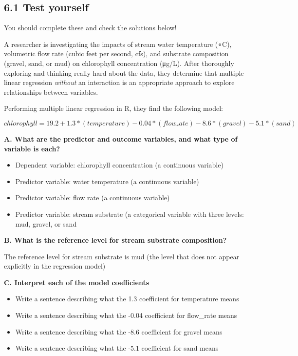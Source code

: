 \documentclass[
]{article}
\begin{document}
\hypertarget{test-yourself}{%
\subsection{6.1 Test yourself}\label{test-yourself}}

You should complete these and check the solutions below!

A researcher is investigating the impacts of stream water temperature
(∘C), volumetric flow rate (cubic feet per second, cfs), and substrate
composition (gravel, sand, or mud) on chlorophyll concentration (μg/L).
After thoroughly exploring and thinking really hard about the data, they
determine that multiple linear regression \emph{without} an interaction
is an appropriate approach to explore relationships between variables.

Performing multiple linear regression in R, they find the following
model:

\[chlorophyll = 19.2 + 1.3*(temperature) - 0.04*(flow_rate) - 8.6*(gravel) - 5.1*(sand)\]

\textbf{A. What are the predictor and outcome variables, and what type
of variable is each?}

\begin{itemize}
\item
  Dependent variable: chlorophyll concentration (a continuous variable)
\item
  Predictor variable: water temperature (a continuous variable)
\item
  Predictor variable: flow rate (a continuous variable)
\item
  Predictor variable: stream substrate (a categorical variable with
  three levels: mud, gravel, or sand
\end{itemize}

\textbf{B. What is the reference level for stream substrate
composition?}

The reference level for stream substrate is mud (the level that does not
appear explicitly in the regression model)

\textbf{C. Interpret each of the model coefficients}

\begin{itemize}
\item
  Write a sentence describing what the 1.3 coefficient for temperature
  means
\item
  Write a sentence describing what the -0.04 coefficient for flow\_rate
  means
\item
  Write a sentence describing what the -8.6 coefficient for gravel means
\item
  Write a sentence describing what the -5.1 coefficient for sand means
\end{itemize}
\end{document}
